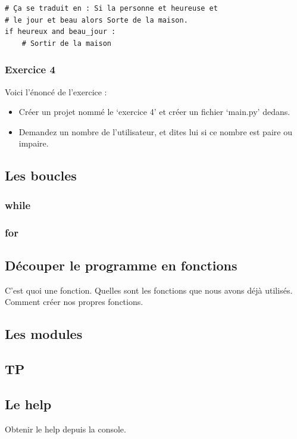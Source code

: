 \documentclass[12pt]{article}
\begin{document}
            \begin{lstlisting}[style=code]
# Ça se traduit en : Si la personne et heureuse et 
# le jour et beau alors Sorte de la maison.
if heureux and beau_jour :
    # Sortir de la maison
            \end{lstlisting}

        \subsubsection{Exercice 4}
            Voici l'énoncé de l'exercice :
            \begin{itemize}
                \item Créer un projet nommé le `exercice 4' et créer un fichier `main.py' dedans.
                \item Demandez un nombre de l'utilisateur, et dites lui si ce nombre est paire ou impaire.
            \end{itemize}

\clearpage

    \subsection{Les boucles}
        \subsubsection{while}
        \subsubsection{for}
    \subsection{Découper le programme en fonctions}
        C'est quoi une fonction. Quelles sont les fonctions que nous avons déjà utilisés. Comment créer nos propres
        fonctions.
    \subsection{Les modules}
    \subsection{TP}
    \subsection{Le help}
        Obtenir le help depuis la console.
\end{document}
